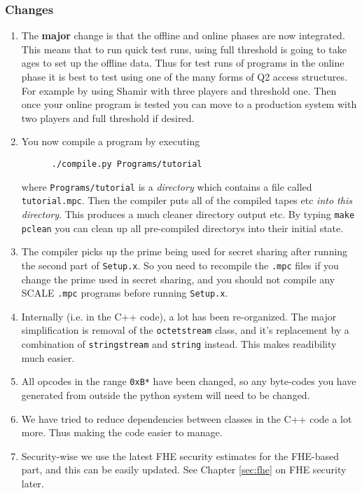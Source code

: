 \subsubsection{Changes}
\begin{enumerate}
\item The {\bf major} change is that the offline and online phases are now integrated.
This means that to run quick test runs, using full threshold is going to take
ages to set up the offline data. Thus for test runs of programs in the online
phase it is best to test using one of the many forms of Q2 access structures.
For example by using Shamir with three players and threshold one. Then once your
online program is tested you can move to a production system with two players
and full threshold if desired.
\item You now compile a program by executing
\begin{verbatim}
      ./compile.py Programs/tutorial
\end{verbatim}
where \verb+Programs/tutorial+ is a {\em directory} which contains
a file called \verb+tutorial.mpc+. Then the compiler puts all of the
compiled tapes etc {\em into this directory}.
This produces a much cleaner directory output etc.
By typing \verb+make pclean+ you can clean up all pre-compiled directorys
into their initial state.
\item The compiler picks up the prime being used for secret sharing
after running the second part of \verb+Setup.x+. So you need to recompile
the \verb+.mpc+ files if  you change the prime used in secret sharing, and you
should not compile any SCALE \verb+.mpc+ programs before running \verb+Setup.x+.
\item Internally (i.e. in the C++ code), a lot has been re-organized. The major simplification
is removal of the \verb+octetstream+ class, and it's replacement by a combination
of \verb+stringstream+ and \verb+string+ instead. This makes readibility
much easier.
\item All opcodes in the range \verb+0xB*+ have been changed, so any byte-codes
you have generated from outside the python system will need to be changed.
\item We have tried to reduce dependencies between classes in the
C++ code a lot more. Thus making the code easier to manage.
\item Security-wise we use the latest FHE security estimates for the
FHE-based part, and this can be easily updated. See Chapter \ref{sec:fhe} on FHE
security later.
\end{enumerate}
